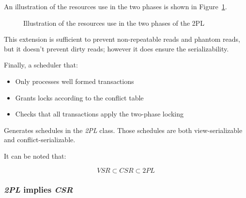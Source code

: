 \documentclass[english]{article}
\begin{document}
An illustration of the resources use in the two phases is shown in Figure~\ref{fig:resources-use-phases-two-phases-locking}.

\begin{figure}[htbp]
  \centering
  \bigskip
  \caption{Illustration of the resources use in the two phases of the 2PL}
  \label{fig:resources-use-phases-two-phases-locking}
  \bigskip
\end{figure}

This extension is sufficient to prevent non-repeatable reads and phantom reads, but it doesn't prevent dirty reads;
however it does ensure the serializability.

\bigskip
Finally, a scheduler that:

\begin{itemize}
  \item Only processes well formed transactions
  \item Grants locks according to the conflict table
  \item Checks that all transactions apply the two-phase locking
\end{itemize}

Generates schedules in the \textit{2PL} class.
Those schedules are both view-serializable and conflict-serializable.

It can be noted that:

\[ \textit{VSR} \subset \textit{CSR} \subset \textit{2PL} \]

\subsubsection{\textit{2PL} implies \textit{CSR}}

\end{document}
